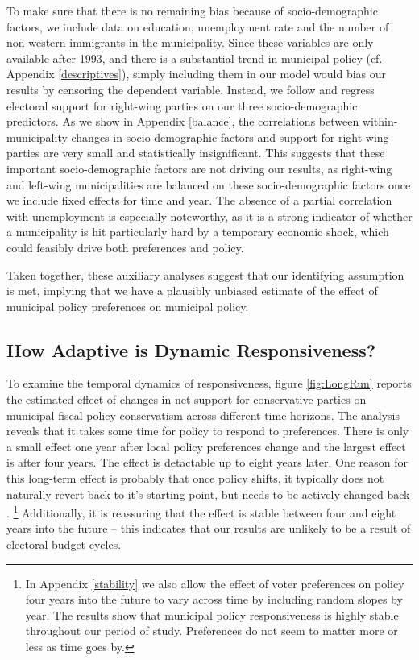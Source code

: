 \documentclass[a4paper,12pt]{article}
\begin{document}
To make sure that there is no remaining bias because of socio-demographic factors, we include data on education, unemployment rate and the number of non-western immigrants in the municipality. Since these variables are only available after 1993, and there is a substantial trend in municipal policy (cf. Appendix \ref{descriptives}), simply including them in our model would bias our results by censoring the dependent variable. Instead, we follow \citep{pei2018poorly} and regress electoral support for right-wing parties on our three socio-demographic predictors. As we show in Appendix \ref{balance}, the correlations between within-municipality changes in socio-demographic factors and support for right-wing parties are very small and statistically insignificant. This suggests that these important socio-demographic factors are not driving our results, as right-wing and left-wing municipalities are balanced on these socio-demographic factors once we include fixed effects for time and year. The absence of a partial correlation with unemployment is especially noteworthy, as it is a strong indicator of whether a municipality is hit particularly hard by a temporary economic shock, which could feasibly drive both preferences and policy.

Taken together, these auxiliary analyses suggest that our identifying assumption is met, implying that we have a plausibly unbiased estimate of the effect of municipal policy preferences on municipal policy.

\subsection*{How Adaptive is Dynamic Responsiveness?}

To examine the temporal dynamics of responsiveness, figure \ref{fig:LongRun} reports the estimated effect of changes in net support for conservative parties on municipal fiscal policy conservatism across different time horizons. The analysis reveals that it takes some time for policy to respond to preferences. There is only a small effect one year after local policy preferences change and the largest effect is after four years. The effect is detactable up to eight years later. One reason for this long-term effect is probably that once policy shifts, it typically does not naturally revert back to it's starting point, but needs to be actively changed back \citep[e.g.,][]{baumgartner2009punctuated}.
\footnote{In Appendix \ref{stability} we also allow the effect of voter preferences on policy four years into the future to vary across time by including random slopes by year. The results show that municipal policy responsiveness is highly stable throughout our period of study. Preferences do not seem to matter more or less as time goes by.} Additionally, it is reassuring that the effect is stable between four and eight years into the future -- this indicates that our results are unlikely to be a result of electoral budget cycles.
\end{document}

